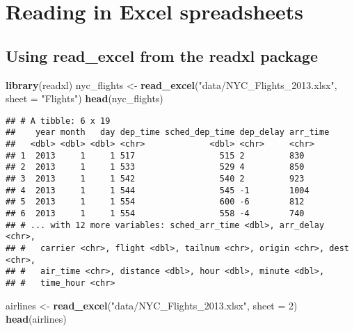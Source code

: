 \documentclass[]{book}
\newenvironment{Shaded}{\begin{snugshade}}{\end{snugshade}}
\newcommand{\DataTypeTok}[1]{\textcolor[rgb]{0.13,0.29,0.53}{#1}}
\newcommand{\DecValTok}[1]{\textcolor[rgb]{0.00,0.00,0.81}{#1}}
\newcommand{\KeywordTok}[1]{\textcolor[rgb]{0.13,0.29,0.53}{\textbf{#1}}}
\newcommand{\NormalTok}[1]{#1}
\newcommand{\StringTok}[1]{\textcolor[rgb]{0.31,0.60,0.02}{#1}}
\begin{document}
\hypertarget{readexcel}{%
\section*{Reading in Excel spreadsheets}\label{readexcel}}

\hypertarget{using-read_excel-from-the-readxl-package}{%
\subsection{\texorpdfstring{Using \textbf{read\_excel} from the \textbf{readxl} package}{Using read\_excel from the readxl package}}\label{using-read_excel-from-the-readxl-package}}

\begin{Shaded}
\begin{Highlighting}[]
\KeywordTok{library}\NormalTok{(readxl)}
\NormalTok{nyc_flights <-}\StringTok{ }\KeywordTok{read_excel}\NormalTok{(}\StringTok{"data/NYC_Flights_2013.xlsx"}\NormalTok{, }\DataTypeTok{sheet =} \StringTok{"Flights"}\NormalTok{)}
\KeywordTok{head}\NormalTok{(nyc_flights)}
\end{Highlighting}
\end{Shaded}

\begin{verbatim}
## # A tibble: 6 x 19
##    year month   day dep_time sched_dep_time dep_delay arr_time
##   <dbl> <dbl> <dbl> <chr>             <dbl> <chr>     <chr>   
## 1  2013     1     1 517                 515 2         830     
## 2  2013     1     1 533                 529 4         850     
## 3  2013     1     1 542                 540 2         923     
## 4  2013     1     1 544                 545 -1        1004    
## 5  2013     1     1 554                 600 -6        812     
## 6  2013     1     1 554                 558 -4        740     
## # ... with 12 more variables: sched_arr_time <dbl>, arr_delay <chr>,
## #   carrier <chr>, flight <dbl>, tailnum <chr>, origin <chr>, dest <chr>,
## #   air_time <chr>, distance <dbl>, hour <dbl>, minute <dbl>,
## #   time_hour <chr>
\end{verbatim}

\begin{Shaded}
\begin{Highlighting}[]
\NormalTok{airlines <-}\StringTok{ }\KeywordTok{read_excel}\NormalTok{(}\StringTok{"data/NYC_Flights_2013.xlsx"}\NormalTok{, }\DataTypeTok{sheet =} \DecValTok{2}\NormalTok{)}
\KeywordTok{head}\NormalTok{(airlines)}
\end{Highlighting}
\end{Shaded}
\end{document}
